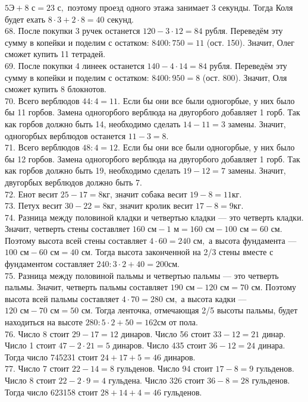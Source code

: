 $5\text{Э}+8\text{ с}=23\text{ с},$ поэтому проезд одного этажа занимает 3 секунды. Тогда Коля будет ехать $8\cdot3+2\cdot8=40$ секунд.\\
68. После покупки 3 ручек останется $120-3\cdot12=84$  рубля. Переведём эту сумму в копейки и поделим с остатком: $8400:750=11$ (ост. 150). Значит, Олег сможет купить 11 тетрадей.\\
69. После покупки 4 линеек останется $140-4\cdot14=84$ рубля. Переведём эту сумму в копейки и поделим с остатком: $8400:950=8$ (ост. 800). Значит, Оля сможет купить 8 блокнотов.\\
70. Всего верблюдов $44:4=11.$ Если бы они все были одногорбые, у них было бы 11 горбов. Замена одногорбого верблюда на двугорбого добавляет 1 горб. Так как горбов должно быть 14, необходимо сделать $14-11=3$ замены. Значит, одногорбых верблюдов останется $11-3=8.$\\
71. Всего верблюдов $48:4=12.$ Если бы они все были одногорбые, у них было бы 12 горбов. Замена одногорбого верблюда на двугорбого добавляет 1 горб. Так как горбов должно быть 19, необходимо сделать $19-12=7$ замены. Значит, двугорбых верблюдов должно быть 7.\\
72. Енот весит $25-17=8$кг, значит собака весит $19-8=11$кг.\\
73. Петух весит $30-22=8$кг, значит кролик весит $17-8=9$кг.\\
74. Разница между половиной кладки и четвертью кладки --- это четверть кладки. Значит, четверть стены составляет $160\text{ см}-1\text{ м}=160\text{ см}-100\text{ см}=60\text{ см}.$ Поэтому высота всей стены составляет $4\cdot60=240\text{ см},$ а высота фундамента --- $100\text{ см}-60\text{ см}=40\text{ см}.$ Тогда высота законченной на 2/3 стены вместе с фундаментом составляет $240:3\cdot2+40=200$см.\\
75. Разница между половиной пальмы и четвертью пальмы --- это четверть пальмы. Значит, четверть пальмы составляет $190\text{ см}-120\text{ см}=70\text{ см}.$
Поэтому высота всей пальмы составляет $4\cdot70=280\text{ см},$ а высота кадки --- $120\text{ см}-70\text{ см}=50\text{ см}.$ Тогда ленточка, отмечающая 2/5 высоты пальмы, будет находиться на высоте $280:5\cdot2+50=162$см от пола.\\
76. Число 8 стоит $29-17=12$ динаров. Число 56 стоит $33-12=21$ динар. Число 1 стоит $47-2\cdot21=5$ динаров. Число 435 стоит $36-12=24$ динара. Тогда число 745231 стоит $24+17+5=46$ динаров.\\
77. Число 7 стоит $22-14=8$ гульденов. Число 94 стоит $17-8=9$ гульденов. Число 8 стоит $22-2\cdot9=4$ гульдена. Число 326 стоит $36-8=28$ гульденов. Тогда число 623158 стоит $28+14+4=46$ гульденов.\\
